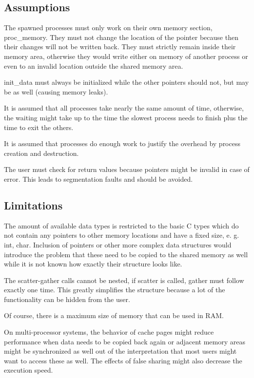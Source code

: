 \documentclass[a4paper]{article}
\begin{document}
\subsection{Assumptions}

The spawned processes must only work on their own memory section, proc\_memory. They must not change the location of the pointer because then their changes will not be written back. They must strictly remain inside their memory area, otherwise they would write either on memory of another process or even to an invalid location outside the shared memory area.  

init\_data must always be initialized while the other pointers should not, but may be as well (causing memory leaks).

It is assumed that all processes take nearly the same amount of time, otherwise, the waiting might take up to the time the slowest process needs to finish plus the time to exit the others.

It is assumed that processes do enough work to justify the overhead by process creation and destruction.

The user must check for return values because pointers might be invalid in case of error. This leads to segmentation faults and should be avoided.


\subsection{Limitations}

The amount of available data types is restricted to the basic C types which do not contain any pointers to other memory locations and have a fixed size, e. g. int, char. Inclusion of pointers or other more complex data structures would introduce the problem that these need to be copied to the shared memory as well while it is not known how exactly their structure looks like.

The scatter-gather calls cannot be nested, if scatter is called, gather must follow exactly one time. This greatly simplifies the structure because a lot of the functionality can be hidden from the user. 

Of course, there is a maximum size of memory that can be used in RAM.

On multi-processor systems, the behavior of cache pages might reduce performance when data needs to be copied back again or adjacent memory areas might be synchronized as well out of the interpretation that most users might want to access these as well. The effects of false sharing might also decrease the execution speed.
\end{document}
